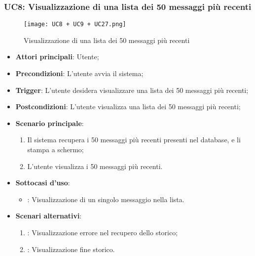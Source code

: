 \hypertarget{UC8}{}
\subsubsection{UC8: Visualizzazione di una lista dei 50 messaggi più recenti}

\begin{figure}[h]
    \centering
    \texttt{[image: UC8 + UC9 + UC27.png]}
    \caption{Visualizzazione di una lista dei 50 messaggi più recenti}
\end{figure}

\begin{itemize}
    \item \textbf{Attori principali}: Utente;
    \item \textbf{Precondizioni}: L'utente avvia il sistema;
    \item \textbf{Trigger}: L'utente desidera visualizzare una lista dei 50 messaggi più recenti;
    \item \textbf{Postcondizioni}: L'utente visualizza una lista dei 50 messaggi più recenti;
    \item \textbf{Scenario principale}:
    \begin{enumerate}
        \item Il sistema recupera i 50 messaggi più recenti presenti nel database, e li stampa a schermo;
        \item L'utente visualizza i 50 messaggi più recenti.
    \end{enumerate}
    \item \textbf{Sottocasi d'uso}:
    \begin{itemize}
        \item {}: Visualizzazione di un singolo messaggio nella lista.
    \end{itemize}
    \item \textbf{Scenari alternativi}:
    \begin{enumerate}
        \item {}: Visualizzazione errore nel recupero dello storico;
        \item {}: Visualizzazione fine storico.
    \end{enumerate}
\end{itemize}

\hypertarget{UC9}{}

